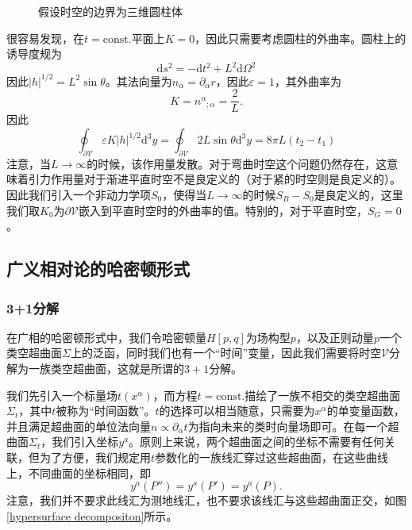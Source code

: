 \documentclass[hyperref, UTF8, a4paper]{ctexart}
\begin{document}
\begin{figure}
	\centering
	
	\caption{假设时空的边界为三维圆柱体}
	\label{nondynamical term example}
\end{figure}

很容易发现，在$t=\mathrm{const.}$平面上$K=0$，因此只需要考虑圆柱的外曲率。圆柱上的诱导度规为
\begin{equation*}
	\mathrm{d} s^{2} =-\mathrm{d} t^{2} +L^{2}\mathrm{d} \Omega^{2}
\end{equation*}
因此$| h| ^{1/2} =L^{2}\sin \theta $。其法向量为$n_{\alpha } =\partial _{\alpha } r$，因此$\varepsilon =1$，其外曲率为
\begin{equation*}
	K=n^{\alpha }{}_{;\alpha } =\frac{2}{L} .
\end{equation*}
因此
\begin{equation*}
	\oint _{\partial \mathscr{V}} \varepsilon K| h| ^{1/2}\mathrm{d}^{3} y=\oint _{\partial \mathscr{V}} 2L\sin \theta \mathrm{d}^{3} y=8\pi L( t_{2} -t_{1})
\end{equation*}
注意，当$L\rightarrow \infty $的时候，该作用量发散。对于弯曲时空这个问题仍然存在，这意味着引力作用量对于渐进平直时空不是良定义的（对于紧的时空则是良定义的）。因此我们引入一个非动力学项$S_{0}$，使得当$L\rightarrow \infty $的时候$S_{B} -S_{0}$是良定义的，这里我们取$K_{0}$为$\partial \mathscr{V}$嵌入到平直时空时的外曲率的值。特别的，对于平直时空，$S_{G} =0$。


\subsection{广义相对论的哈密顿形式}
\subsubsection{3+1分解}

在广相的哈密顿形式中，我们令哈密顿量$H[ p,q]$为场构型$p$，以及正则动量$p$一个类空超曲面$\Sigma $上的泛函，同时我们也有一个“时间”变量，因此我们需要将时空$\mathscr{V}$分解为一族类空超曲面，这就是所谓的$3+1$分解。



我们先引入一个标量场$t(x^{\alpha } )$，而方程$t=\mathrm{const.}$描绘了一族不相交的类空超曲面$\Sigma _{t}$，其中$t$被称为“时间函数”。$t$的选择可以相当随意，只需要为$x^{\alpha }$的单变量函数，并且满足超曲面的单位法向量$n\varpropto \partial _{\alpha } t$为指向未来的类时向量场即可。在每一个超曲面$\Sigma _{t}$，我们引入坐标$y^{a}$。原则上来说，两个超曲面之间的坐标不需要有任何关联，但为了方便，我们规定用$t$参数化的一族线汇穿过这些超曲面，在这些曲线上，不同曲面的坐标相同，即
\begin{equation*}
	y^{a}( P'') =y^{a} (P' )=y^{a}( P) .
\end{equation*}
注意，我们并不要求此线汇为测地线汇，也不要求该线汇与这些超曲面正交，如图\ref{hypersurface decompositon}所示。
\end{document}
